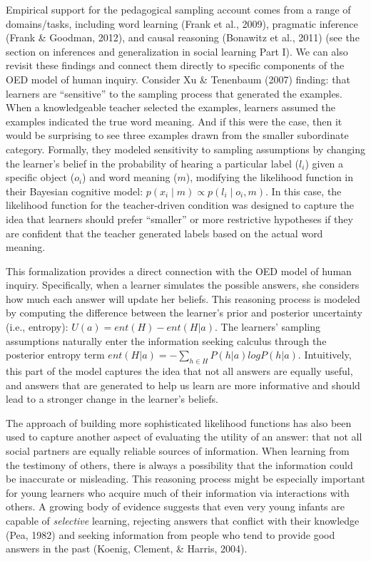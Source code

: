 \documentclass[oneside]{report}
\begin{document}
Empirical support for the pedagogical sampling account comes from a
range of domains/tasks, including word learning (Frank et al., 2009),
pragmatic inference (Frank \& Goodman, 2012), and causal reasoning
(Bonawitz et al., 2011) (see the section on inferences and
generalization in social learning Part I). We can also revisit these
findings and connect them directly to specific components of the OED
model of human inquiry. Consider Xu \& Tenenbaum (2007) finding: that
learners are ``sensitive'' to the sampling process that generated the
examples. When a knowledgeable teacher selected the examples, learners
assumed the examples indicated the true word meaning. And if this were
the case, then it would be surprising to see three examples drawn from
the smaller subordinate category. Formally, they modeled sensitivity to
sampling assumptions by changing the learner's belief in the probability
of hearing a particular label (\(l_i\)) given a specific object
(\(o_i\)) and word meaning (\(m\)), modifying the likelihood function in
their Bayesian cognitive model:
\(p(x_i \mid m) \propto p(l_i \mid o_i, m)\). In this case, the
likelihood function for the teacher-driven condition was designed to
capture the idea that learners should prefer ``smaller'' or more
restrictive hypotheses if they are confident that the teacher generated
labels based on the actual word meaning.

This formalization provides a direct connection with the OED model of
human inquiry. Specifically, when a learner simulates the possible
answers, she considers how much each answer will update her beliefs.
This reasoning process is modeled by computing the difference between
the learner's prior and posterior uncertainty (i.e., entropy):
\(U(a) = ent(H) - ent(H|a)\). The learners' sampling assumptions
naturally enter the information seeking calculus through the posterior
entropy term \(ent(H|a) = -\sum_{h\in H}{P(h|a)logP(h|a)}\).
Intuitively, this part of the model captures the idea that not all
answers are equally useful, and answers that are generated to help us
learn are more informative and should lead to a stronger change in the
learner's beliefs.

The approach of building more sophisticated likelihood functions has
also been used to capture another aspect of evaluating the utility of an
answer: that not all social partners are equally reliable sources of
information. When learning from the testimony of others, there is always
a possibility that the information could be inaccurate or misleading.
This reasoning process might be especially important for young learners
who acquire much of their information via interactions with others. A
growing body of evidence suggests that even very young infants are
capable of \emph{selective} learning, rejecting answers that conflict
with their knowledge (Pea, 1982) and seeking information from people who
tend to provide good answers in the past (Koenig, Clement, \& Harris,
2004).
\end{document}
